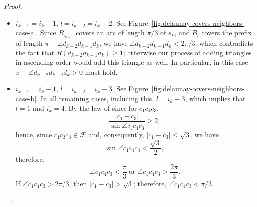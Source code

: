 \begin{appendices}
\begin{proof}
\begin{itemize}
    \item $i_{k-1} = i_k - 1$, $l = i_{k-2} = i_k - 2$. See Figure~\ref{fig:delaunay-covers-neighbors-case-a}. Since $B_{i_{k-1}}$ covers an arc of length $\pi/3$ of $s_k$, and $B_l$ covers the prefix of length $\pi - \angle{d_{k-2}d_{k-1}d_k}$, we have $\angle{d_{k-2}d_{k-1}d_k} < 2\pi/3$, which contradicts the fact that $R(d_{k-2}d_{k-1}d_k)\geq 1$; otherwise our process of adding triangles in ascending order would add this triangle as well. In particular, in this case $\pi - \angle{d_{k-2}d_{k-1}d_k} > 0$ must hold.
    \item $i_{k-1} = i_k - 1$, $l = i_{k-2} = i_k - 3$. See Figure~\ref{fig:delaunay-covers-neighbors-case-b}. In all remaining cases, including this, $l = i_k - 3$, which implies that $l = 1$ and $i_k = 4$. By the law of sines for $c_1c_4c_3$,
    $$\frac{|c_1 - c_3|}{\sin\angle c_1c_4c_3}\geq 2,$$
    hence, since $c_1c_2c_3\in\mathcal{F}$ and, consequently, $|c_1 - c_3|\leq\sqrt3$, we have
    $$\sin\angle c_1c_4c_3 < \frac{\sqrt{3}}{2},$$
    therefore,
    $$\angle c_1c_4c_3 < \frac{\pi}{3}\text{ or }\angle c_1c_4c_3 > \frac{2\pi}{3}.$$
    If $\angle{c_1c_4c_3} > 2\pi/3$, then $|c_1 - c_3| > \sqrt{3}$; therefore, $\angle c_1c_4c_3 < \pi/3$.
    

\end{itemize}
\end{proof}
\end{appendices}
